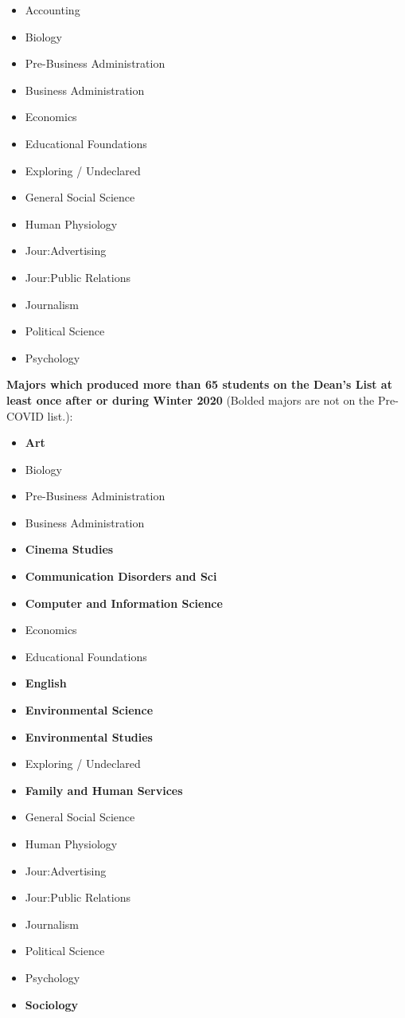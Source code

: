 \documentclass[10]{article}
\begin{document}
\begin{itemize}
\item Accounting
\item Biology
\item Pre-Business Administration
\item Business Administration
\item Economics
\item Educational Foundations
\item Exploring / Undeclared
\item General Social Science
\item Human Physiology
\item Jour:Advertising
\item Jour:Public Relations
\item Journalism
\item Political Science
\item Psychology
\end{itemize}


\textbf{Majors which produced more than 65 students on the Dean's List at least once after or during Winter 2020} (Bolded majors are not on the Pre-COVID list.):

\begin{itemize}
\item \textbf{Art}
\item Biology
\item Pre-Business Administration
\item Business Administration
\item \textbf{Cinema Studies}
\item \textbf{Communication Disorders and Sci}
\item \textbf{Computer and Information Science}
\item Economics
\item Educational Foundations
\item \textbf{English}
\item \textbf{Environmental Science}
\item \textbf{Environmental Studies}
\item Exploring / Undeclared
\item \textbf{Family and Human Services}
\item General Social Science
\item Human Physiology
\item Jour:Advertising
\item Jour:Public Relations
\item Journalism
\item Political Science
\item Psychology
\item \textbf{Sociology}
\end{itemize}
\end{document}

